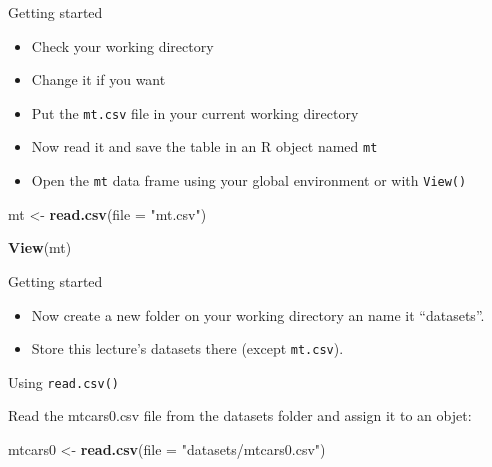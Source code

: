 \documentclass[ignorenonframetext,]{beamer}
\newenvironment{Shaded}{\begin{snugshade}}{\end{snugshade}}
\newcommand{\DataTypeTok}[1]{\textcolor[rgb]{0.13,0.29,0.53}{#1}}
\newcommand{\KeywordTok}[1]{\textcolor[rgb]{0.13,0.29,0.53}{\textbf{#1}}}
\newcommand{\NormalTok}[1]{#1}
\newcommand{\StringTok}[1]{\textcolor[rgb]{0.31,0.60,0.02}{#1}}
\begin{document}
\begin{frame}[fragile]{Getting started}
\protect\hypertarget{getting-started}{}

\begin{itemize}
\item
  Check your working directory
\item
  Change it if you want
\item
  Put the \texttt{mt.csv} file in your current working directory
\item
  Now read it and save the table in an R object named \texttt{mt}
\item
  Open the \texttt{mt} data frame using your global environment or with
  \texttt{View()}
\end{itemize}

\begin{Shaded}
\begin{Highlighting}[]
\NormalTok{mt <-}\StringTok{ }\KeywordTok{read.csv}\NormalTok{(}\DataTypeTok{file =} \StringTok{"mt.csv"}\NormalTok{)}
\end{Highlighting}
\end{Shaded}

\begin{Shaded}
\begin{Highlighting}[]
\KeywordTok{View}\NormalTok{(mt)}
\end{Highlighting}
\end{Shaded}

\end{frame}

\begin{frame}[fragile]{Getting started}
\protect\hypertarget{getting-started-1}{}

\begin{itemize}
\item
  Now create a new folder on your working directory an name it
  ``datasets''.
\item
  Store this lecture's datasets there (except \texttt{mt.csv}).
\end{itemize}

\end{frame}

\begin{frame}[fragile]{Using \texttt{read.csv()}}
\protect\hypertarget{using-read.csv}{}

Read the mtcars0.csv file from the datasets folder and assign it to an
objet:

\begin{Shaded}
\begin{Highlighting}[]
\NormalTok{mtcars0 <-}\StringTok{ }\KeywordTok{read.csv}\NormalTok{(}\DataTypeTok{file =} \StringTok{"datasets/mtcars0.csv"}\NormalTok{)}
\end{Highlighting}
\end{Shaded}

\end{frame}
\end{document}
